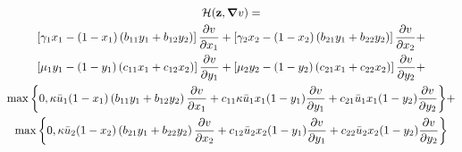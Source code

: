 \begin{multline}
  \label{eq:HamiltonianShort}
  \mathcal{H}(\mathbf{z}, \grad{v}) = \\
  \left[\gamma_1 x_1 - (1-x_1) \left(b_{11} y_1 + b_{12} y_2\right) \right] \pdv{v}{x_1} +
  \left[\gamma_2 x_2 - (1-x_2) \left(b_{21} y_1 + b_{22} y_2\right) \right] \pdv{v}{x_2} + \\
  \left[\mu_1 y_1 - (1-y_1) \left(c_{11} x_1 + c_{12} x_2\right) \right] \pdv{v}{y_1} +
  \left[\mu_2 y_2 - (1-y_2) \left(c_{21} x_1 + c_{22} x_2\right)\right] \pdv{v}{y_2} + \\
  \max\bigg\{0, \kappa \bar{u}_1 (1-x_1) \left(b_{11} y_1 + b_{12} y_2\right) \pdv{v}{x_1} + c_{11} \kappa \bar{u}_1 x_1 (1-y_1)\pdv{v}{y_1} + c_{21} \bar{u}_1 x_1 (1-y_2) \pdv{v}{y_2}
  \bigg\} + \\
  \max\bigg\{0, \kappa \bar{u}_2 (1-x_2) \left(b_{21} y_1 + b_{22} y_2\right) \pdv{v}{x_2} + c_{12} \bar{u}_2 x_2 (1-y_1)\pdv{v}{y_1} + c_{22}  \bar{u}_2 x_2 (1-y_2)\pdv{v}{y_2} \bigg\}
\end{multline}
